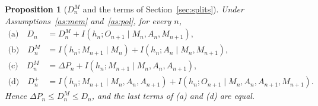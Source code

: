 \documentclass{article}
\newtheorem{proposition}{Proposition}[section]
\theoremstyle{definition}
\theoremstyle{remark}
\newcommand{\dP}{\Delta P}
\begin{document}
\begin{proposition}[$D^M_n$ and the terms of Section~\ref{sec:splits}]\label{prop:DM}
Under Assumptions~\ref{as:mem} and~\ref{as:pol}, for every $n$,
\begin{align*}
\text{(a)}\quad D_n&=D^M_n+I(h_n;O_{n+1}\mid M_n,A_n,M_{n+1}),\\
\text{(b)}\quad D^M_n&=I(h_n;M_{n+1}\mid M_n)+I(h_n;A_n\mid M_n,M_{n+1}),\\
\text{(c)}\quad D^M_n&=\dP_n+I(h_n;M_{n+1}\mid M_n,A_n,A_{n+1}),\\
\text{(d)}\quad D^+_n&=I(h_n;M_{n+1}\mid M_n,A_n,A_{n+1})+I(h_n;O_{n+1}\mid M_n,A_n,A_{n+1},M_{n+1}).
\end{align*}
Hence $\dP_n\le D^M_n\le D_n$, and the last terms of (a) and (d) are equal.
\end{proposition}
\end{document}
